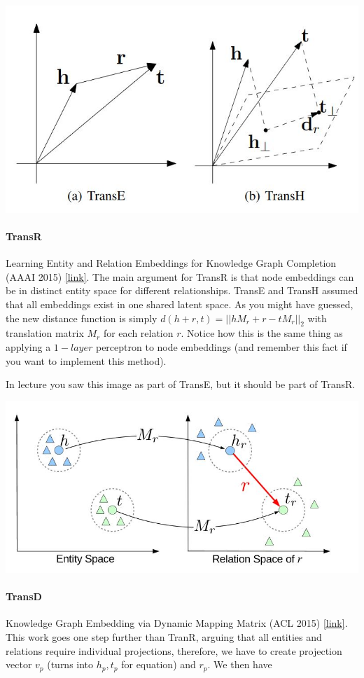 {
\centering
\includegraphics[width=0.5\linewidth]{notes/img/n5_transh.JPG} \par
}

\paragraph{TransR} Learning Entity and Relation Embeddings for Knowledge Graph Completion (AAAI 2015) \href{https://www.aaai.org/ocs/index.php/AAAI/AAAI15/paper/viewFile/9571/9523}{[link]}. The main argument for TransR is that node embeddings can be in distinct entity space for different relationships. TransE and TransH assumed that all embeddings exist in one shared latent space. As you might have guessed, the new distance function is simply $d(h+r, t) = ||hM_r + r - tM_r||_2$ with translation matrix $M_r$ for each relation $r$. Notice how this is the same thing as applying a $1-layer$ perceptron to node embeddings (and remember this fact if you want to implement this method).

In lecture you saw this image as part of TransE, but it should be part of TransR.

{
\centering
\includegraphics[width=0.5\linewidth]{notes/img/n5_transr.JPG} \par
}

\paragraph{TransD} Knowledge Graph Embedding via Dynamic Mapping Matrix (ACL 2015) \href{https://www.aclweb.org/anthology/P15-1067.pdf}{[link]}. This work goes one step further than TranR, arguing that all entities and relations require individual projections, therefore, we have to create projection vector $v_p$ (turns into $h_p, t_p$ for equation) and $r_p$. We then have 

